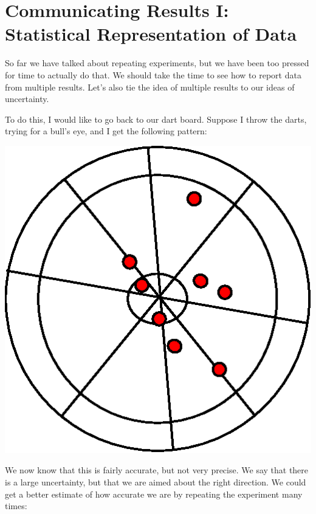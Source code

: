 \documentclass{book}%
\begin{document}
\chapter[Statistical Representation of Data]{Communicating Results I: Statistical Representation of Data}

So far we have talked about repeating experiments, but we have been too
pressed for time to actually do that. We should take the time to see how to
report data from multiple results. Let's also tie the idea of multiple
results to our ideas of uncertainty.

To do this, I would like to go back to our dart board. Suppose I throw the
darts, trying for a bull's eye, and I get the following pattern:

\begin{center}
\includegraphics[scale=0.5]{Lab2_figs/bullseye_few.eps}
\end{center}

We now know that this is fairly accurate, but not very precise. We say that
there is a large uncertainty, but that we are aimed about the right
direction. We could get a better estimate of how accurate we are by
repeating the experiment many times:
\end{document}
